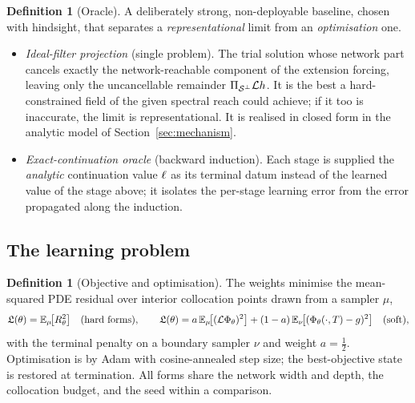 \documentclass[11pt]{article}
\theoremstyle{plain}
\theoremstyle{definition}
\newtheorem{definition}[theorem]{Definition}
\theoremstyle{remark}
\begin{document}
\begin{definition}[Oracle]\label{def:oracle}
A deliberately strong, non-deployable baseline, chosen with hindsight, that
separates a \emph{representational} limit from an \emph{optimisation} one.
\begin{itemize}
  \item \emph{Ideal-filter projection} (single problem). The trial solution whose
    network part cancels exactly the network-reachable component of the extension
    forcing, leaving only the uncancellable remainder
    $\Pi_{\mathcal{S}^{\perp}}\mathcal{L}h$. It is the best a
    hard-constrained field of the given spectral reach could achieve; if it too
    is inaccurate, the limit is representational. It is realised in closed form in
    the analytic model of Section~\ref{sec:mechanism}.
  \item \emph{Exact-continuation oracle} (backward induction). Each stage is
    supplied the \emph{analytic} continuation value $\ell$ as its
    terminal datum instead of the learned value of the stage above; it isolates
    the per-stage learning error from the error propagated along the induction.
\end{itemize}
\end{definition}

\subsection{The learning problem}\label{sec:learning}

\begin{definition}[Objective and optimisation]\label{def:learning}
The weights minimise the mean-squared PDE residual over interior collocation
points drawn from a sampler $\mu$,
\begin{equation}\label{eq:objective}
  \mathfrak{L}(\theta)
  =\mathbb{E}_{\mu}\!\bigl[R_{\theta}^{2}\bigr]
   \quad(\text{hard forms}),
  \qquad
  \mathfrak{L}(\theta)
  =a\,\mathbb{E}_{\mu}\!\bigl[(\mathcal{L}\Phi_{\theta})^{2}\bigr]
   +(1-a)\,\mathbb{E}_{\nu}\!\bigl[(\Phi_{\theta}(\cdot,T)-g)^{2}\bigr]
   \quad(\text{soft}),
\end{equation}
with the terminal penalty on a boundary sampler $\nu$ and weight $a=\tfrac12$.
Optimisation is by Adam with cosine-annealed step size; the best-objective state
is restored at termination. All forms share the network width and depth, the
collocation budget, and the seed within a comparison.
\end{definition}
\end{document}
